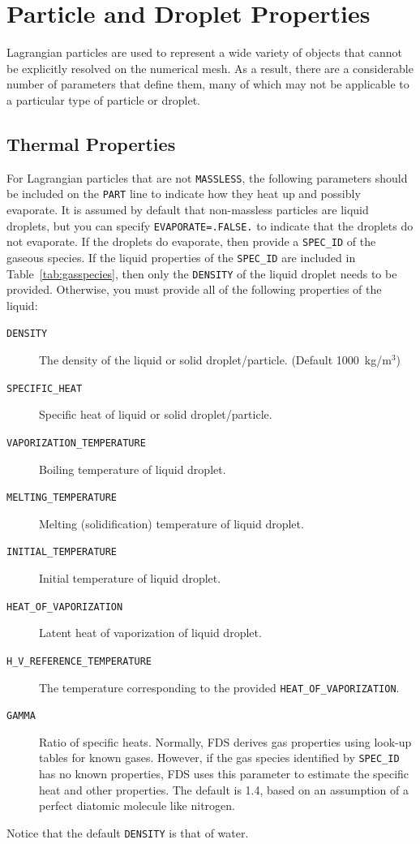 \documentclass[11pt]{book}
\newcommand{\ct}{\tt\small}
\begin{document}
\clearpage

\section{Particle and Droplet Properties}

Lagrangian particles are used to represent a wide variety of objects that cannot be explicitly resolved on the numerical
mesh. As a result, there are a considerable number of parameters that define them, many of which may not be applicable to
a particular type of particle or droplet.


\subsection{Thermal Properties}

\label{thermal_part_props}

For Lagrangian particles that are not {\ct MASSLESS}, the following parameters should be
included on the {\ct PART} line to indicate how they heat up and possibly evaporate. It is assumed by default that non-massless particles are
liquid droplets, but you can specify {\ct EVAPORATE=.FALSE.} to indicate that the droplets do not evaporate. If the droplets do evaporate, then
provide a {\ct SPEC\_ID} of the gaseous species. If the liquid properties of the {\ct SPEC\_ID} are included in Table~\ref{tab:gasspecies},
then only the {\ct DENSITY} of the liquid droplet needs to be provided. Otherwise, you must provide all of the following properties of the liquid:
\begin{description}
\item[{\ct DENSITY}] The density of the liquid or solid droplet/particle.
(Default 1000~kg/m$^3$)
\item[{\ct SPECIFIC\_HEAT}] Specific heat of liquid or solid droplet/particle.
\item[{\ct VAPORIZATION\_TEMPERATURE}] Boiling temperature of liquid droplet.
\item[{\ct MELTING\_TEMPERATURE}] Melting (solidification) temperature of liquid droplet.
\item[{\ct INITIAL\_TEMPERATURE}] Initial temperature of liquid droplet.
\item[{\ct HEAT\_OF\_VAPORIZATION}] Latent heat of vaporization of liquid droplet.
\item[{\ct H\_V\_REFERENCE\_TEMPERATURE}] The temperature corresponding to the provided {\ct HEAT\_OF\_VAPORIZATION}.
\item[{\ct GAMMA}] Ratio of specific heats. Normally, FDS derives gas properties using look-up tables for known gases. However, if the
gas species identified by {\ct SPEC\_ID} has no known properties, FDS uses this parameter to estimate the specific heat and other properties. The default is
1.4, based on an assumption of a perfect diatomic molecule like nitrogen.
\end{description}
Notice that the default {\ct DENSITY} is that of water.
\end{document}
